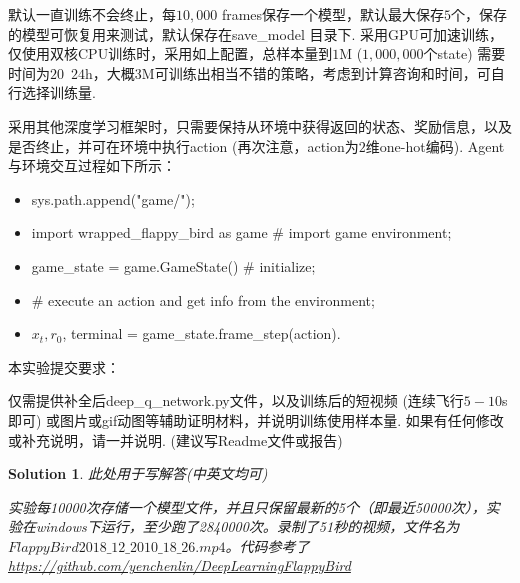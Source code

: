 \documentclass[a4paper,UTF8]{article}
\numberwithin{equation}{section}
\newtheorem*{mySol}{Solution}
\begin{document}
默认一直训练不会终止，每$10,000$ frames保存一个模型，默认最大保存$5$个，保存的模型可恢复用来测试，默认保存在save\_model 目录下. 采用GPU可加速训练，仅使用双核CPU训练时，采用如上配置，总样本量到$1$M ($1,000,000$个state) 需要时间为$20$~$24$h，大概$3$M可训练出相当不错的策略，考虑到计算咨询和时间，可自行选择训练量.

采用其他深度学习框架时，只需要保持从环境中获得返回的状态、奖励信息，以及是否终止，并可在环境中执行action (再次注意，action为$2$维one-hot编码). Agent与环境交互过程如下所示：
\begin{itemize}
	\item sys.path.append("game/");
	\item import wrapped\_flappy\_bird as game \# import game environment;
	\item game\_state = game.GameState() \# initialize;
	\item \# execute an action and get info from the environment;
	\item $x_t, r_0$, terminal = game\_state.frame\_step(action).
\end{itemize}

本实验提交要求：

仅需提供补全后deep\_q\_network.py文件，以及训练后的短视频 (连续飞行$5-10$s 即可) 或图片或gif动图等辅助证明材料，并说明训练使用样本量. 如果有任何修改或补充说明，请一并说明. (建议写Readme文件或报告)



\begin{mySol}
此处用于写解答(中英文均可)

实验每10000次存储一个模型文件，并且只保留最新的5个（即最近50000次），实验在windows下运行，至少跑了2840000次。录制了51秒的视频，文件名为$Flappy Bird 2018\_12\_20 10\_18\_26.mp4$。代码参考了\url{https://github.com/yenchenlin/DeepLearningFlappyBird}

\end{mySol}
\newpage




\end{document}
